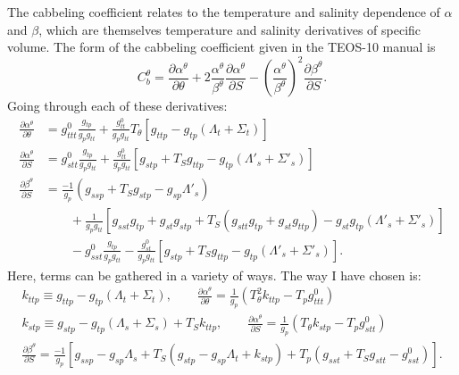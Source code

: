 \documentclass{article}
\begin{document}
The cabbeling coefficient relates to the temperature and salinity dependence of $\alpha$ and $\beta$, which are themselves temperature and salinity derivatives of specific volume. The form of the cabbeling coefficient given in the TEOS-10 manual is
\begin{equation*}
    C_b^{\theta} = \frac{\partial \alpha^{\theta}}{\partial \theta} + 2 \frac{\alpha^{\theta}}{\beta^{\theta}} \frac{\partial \alpha^{\theta}}{\partial S} - \left( \frac{\alpha^{\theta}}{\beta^{\theta}} \right)^2 \frac{\partial \beta^{\theta}}{\partial S}.
\end{equation*}
Going through each of these derivatives:
\begin{align*}
    \frac{\partial \alpha^{\theta}}{\partial \theta} &= g^0_{ttt} \frac{g_{tp}}{g_p g_{tt}} + \frac{g^0_{tt}}{g_p g_{tt}} T_{\theta} \left[ g_{ttp} - g_{tp} (\Lambda_t + \Sigma_t) \right] \\
    \frac{\partial \alpha^{\theta}}{\partial S} &= g^0_{stt} \frac{g_{tp}}{g_p g_{tt}} + \frac{g^0_{tt}}{g_p g_{tt}} \left[ g_{stp} + T_S g_{ttp} - g_{tp} (\Lambda'_s + \Sigma'_s) \right] \\
    \frac{\partial \beta^{\theta}}{\partial S} &= \frac{-1}{g_p} \left( g_{ssp} + T_S g_{stp} - g_{sp} \Lambda'_s \right) \\
    &\qquad + \frac{1}{g_p g_{tt}} \left[ g_{sst} g_{tp} + g_{st} g_{stp} + T_S \left( g_{stt} g_{tp} + g_{st} g_{ttp} \right) - g_{st} g_{tp} (\Lambda'_s + \Sigma'_s) \right] \\
    &\qquad - g^0_{sst} \frac{g_{tp}}{g_p g_{tt}} - \frac{g^0_{st}}{g_p g_{tt}} \left[ g_{stp} + T_S g_{ttp} - g_{tp} \left( \Lambda'_s + \Sigma'_s \right) \right].
\end{align*}
Here, terms can be gathered in a variety of ways. The way I have chosen is:
\begin{gather*}
    k_{ttp} \equiv g_{ttp} - g_{tp} (\Lambda_t + \Sigma_t), \qquad \frac{\partial \alpha^{\theta}}{\partial \theta} = \frac{1}{g_p} \left( T_{\theta}^2 k_{ttp} - T_p g^0_{ttt} \right) \\
    k_{stp} \equiv g_{stp} - g_{tp} (\Lambda_s + \Sigma_s) + T_S k_{ttp}, \qquad \frac{\partial \alpha^{\theta}}{\partial S} = \frac{1}{g_p} \left( T_{\theta} k_{stp} - T_p g^0_{stt} \right) \\
    \frac{\partial \beta^{\theta}}{\partial S} = \frac{-1}{g_p} \left[ g_{ssp} - g_{sp} \Lambda_s + T_S (g_{stp} - g_{sp} \Lambda_t + k_{stp}) + T_p (g_{sst} + T_S g_{stt} - g^0_{sst}) \right].
\end{gather*}
\end{document}
